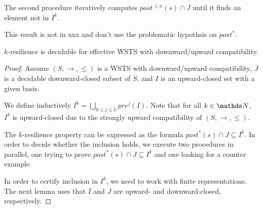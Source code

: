 The second procedure iteratively computes
$post^{\leq n}(s) \cap J$
until it finds an element
not in $ I^k$.


This result is not in xxx and don't use the problematic hypothsis on $post^*$.

\begin{theorem}
{\sc $k$-resilience} is decidable for effective WSTS with downward/upward compatibility.
\end{theorem}


\begin{proof}

Assume  $(S, \rightarrow, \leq)$ is a WSTS with downward/upward compatibility, $J$ is a decidable downward-closed subset of $S$, and $I$ is an upward-closed set with a given basis.

We define inductively
$I^{k} = \bigcup_{0 \leq j \leq k} pre^j(I)$. Note that for all $k \in \N$, $I^k$ is upward-closed due to
the strongly upward compatibility of $(S, \rightarrow, \leq)$.


The $k$-resilience property can be expressed as the formula
$ post^*(s) \cap J \subseteq I^k$. In order to decide whether the inclusion holds, we execute two procedures in parallel, one trying to prove $ post^*(s)\cap J \subseteq I^k$ 
and one looking for a counter example.

In order to certify inclusion in $I^k$, we need to work with finite representations.
The next lemma uses that $I$ and $J$ are upward- and downward-closed, respectively.










\end{proof}
